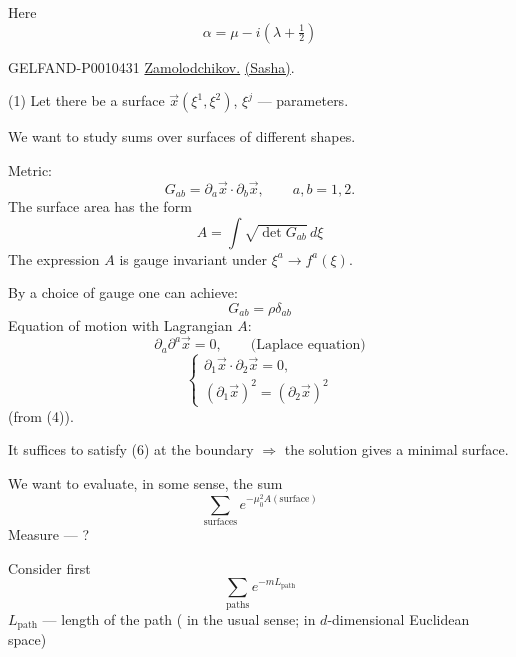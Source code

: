 Here
\begin{equation*}
\alpha=\mu-i(\lambda+\tfrac12)
\tag{16}
\end{equation*}


\begin{GelfandAdjacentEvidence}{GELFAND-P001043}{1}
\underline{Zamolodchikov.} \underline{(Sasha)}.

(1) Let there be a surface $\vec{x}(\xi^1,\xi^2)$, $\xi^j$ — parameters.

We want to study sums over surfaces of different shapes.

Metric:
\begin{equation*}
G_{ab}=\partial_a\vec{x}\cdot\partial_b\vec{x},\qquad a,b=1,2.
\tag{2}
\end{equation*}
The surface area has the form
\begin{equation*}
A=\int\sqrt{\det G_{ab}}\,d\xi
\tag{3}
\end{equation*}
The expression \(A\) is gauge invariant under $\xi^a\to f^a(\xi)$.

By a choice of gauge one can achieve:
\begin{equation*}
G_{ab}=\rho\delta_{ab}
\tag{4}
\end{equation*}
Equation of motion with Lagrangian $A$:
\begin{equation*}
\partial_a\partial^a\vec{x}=0,\qquad\text{(Laplace equation)}
\tag{5}
\end{equation*}
\begin{equation*}
\begin{cases}
\partial_1\vec{x}\cdot\partial_2\vec{x}=0,\\
(\partial_1\vec{x})^2=(\partial_2\vec{x})^2
\end{cases}
\tag{6}
\end{equation*}
(from (4)).

It suffices to satisfy (6) at the boundary $\Rightarrow$ the solution gives a minimal surface.
\end{GelfandAdjacentEvidence}


We want to evaluate, in some sense, the sum
\begin{equation*}
\sum_{\text{surfaces}}e^{-\mu_0^2 A(\text{surface})}
\tag{7}
\end{equation*}
Measure — ?

Consider first
\begin{equation*}
\sum_{\text{paths}}e^{-mL_{\text{path}}}
\tag{8}
\end{equation*}
$L_{\text{path}}$ — length of the path ( in the usual sense; in $d$-dimensional Euclidean space)

